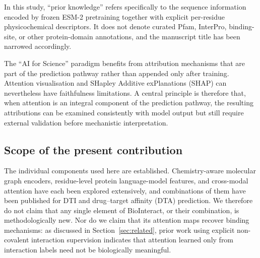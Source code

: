 \documentclass[fleqn,10pt]{wlscirep}
\begin{document}
In this study, ``prior knowledge'' refers specifically to the
sequence information encoded by frozen ESM-2 pretraining together with explicit
per-residue physicochemical descriptors. It does not denote curated Pfam,
InterPro, binding-site, or other protein-domain annotations, and the manuscript
title has been narrowed accordingly.

The ``AI for Science'' paradigm benefits from attribution mechanisms that are
part of the prediction pathway rather than appended only after training.
Attention visualisation and SHapley Additive exPlanations (SHAP) can nevertheless
have faithfulness limitations.\cite{jain2019attention} A central principle is
therefore that, when attention is an integral component of the prediction
pathway, the resulting attributions can be examined consistently with model
output but still require external validation before mechanistic interpretation.

\subsection*{Scope of the present contribution}

The individual components used here are established.  Chemistry-aware molecular
graph encoders, residue-level protein language-model features, and cross-modal
attention have each been explored extensively, and combinations of them have
been published for DTI and drug--target affinity (DTA)
prediction.\cite{nguyen2022gefa,bal2023pgraphdta,li2025hcafdta}  We therefore do
not claim that any single element of BioInteract, or their combination, is
methodologically new.  Nor do we claim that its attention maps recover binding
mechanisms: as discussed in Section~\ref{sec:related}, prior work using explicit
non-covalent interaction supervision indicates that attention learned only from
interaction labels need not be biologically
meaningful.\cite{li2020monn,gim2023arkdta,seo2024blendnet}
\end{document}
